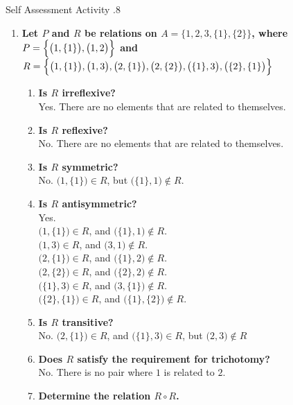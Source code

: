 \documentclass[../notes.tex]{subfiles}
\begin{document}
				\begin{exercise}{Self Assessment Activity \thechapter.8}
					\begin{enumerate}
						\item \textbf{Let $P$ and $R$ be relations on $A = \bigl\{1, 2, 3, \{1\}, \{2\}\bigr\}$, where\\
						$P = \Bigl\{\bigl(1, \{1\}\bigr), \bigl(1, 2\bigr)\Bigr\}$ and $R = \Bigl\{\bigl(1, \{1\}\bigr), \bigl(1, 3\bigr), \bigl(2, \{1\}\bigr), \bigl(2, \{2\}\bigr), \bigl(\{1\}, 3\bigr), \bigl(\{2\}, \{1\}\bigr) \Bigr\}$}
							\begin{enumerate}[label=(\alph*)]
								\item \textbf{Is $R$ irreflexive?}\\
									Yes. There are no elements that are related to themselves.
								\item \textbf{Is $R$ reflexive?}\\
									No. There are no elements that are related to themselves.
								\item \textbf{Is $R$ symmetric?}\\
									No. $\bigl(1, \{1\}\bigr) \in R$, but $\bigl(\{1\}, 1\bigr) \notin R$.
								\item \textbf{Is $R$ antisymmetric?}\\
									Yes.\\
									$\bigl(1, \{1\}\bigr) \in R$, and $\bigl(\{1\}, 1\bigr) \notin R$.\\
									$\bigl(1, 3\bigr) \in R$, and $\bigl(3, 1\bigr) \notin R$.\\
									$\bigl(2, \{1\}\bigr) \in R$, and $\bigl(\{1\}, 2\bigr) \notin R$.\\
									$\bigl(2, \{2\}\bigr) \in R$, and $\bigl(\{2\}, 2\bigr) \notin R$.\\
									$\bigl(\{1\}, 3\bigr) \in R$, and $\bigl(3, \{1\}\bigr) \notin R$.\\
									$\bigl(\{2\}, \{1\}\bigr) \in R$, and $\bigl(\{1\}, \{2\}\bigr) \notin R$.
								\item \textbf{Is $R$ transitive?}\\
									No. $\bigl(2, \{1\}\bigr) \in R$, and $\bigl(\{1\}, 3\bigr) \in R$, but $\bigl(2, 3\bigr) \notin R$
								\item \textbf{Does $R$ satisfy the requirement for trichotomy?}\\
									No. There is no pair where $1$ is related to $2$.
								\item \textbf{Determine the relation $R \circ R$.}\\

\end{enumerate}
\end{enumerate}
\end{exercise}
\end{document}
